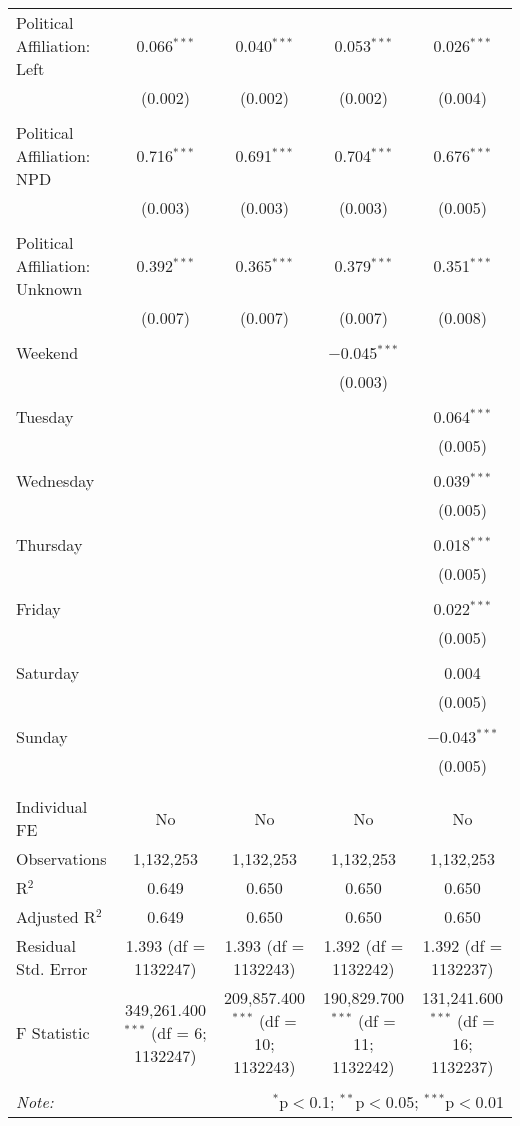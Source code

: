 \documentclass[
]{article}
\begin{document}
\begin{table}[!htbp]
{\begin{tabular}{@{\extracolsep{5pt}}lcccc}
 Political Affiliation: Left & 0.066$^{***}$ & 0.040$^{***}$ & 0.053$^{***}$ & 0.026$^{***}$ \\ 
  & (0.002) & (0.002) & (0.002) & (0.004) \\ 
  & & & & \\ 
 Political Affiliation: NPD & 0.716$^{***}$ & 0.691$^{***}$ & 0.704$^{***}$ & 0.676$^{***}$ \\ 
  & (0.003) & (0.003) & (0.003) & (0.005) \\ 
  & & & & \\ 
 Political Affiliation: Unknown & 0.392$^{***}$ & 0.365$^{***}$ & 0.379$^{***}$ & 0.351$^{***}$ \\ 
  & (0.007) & (0.007) & (0.007) & (0.008) \\ 
  & & & & \\ 
 Weekend &  &  & $-$0.045$^{***}$ &  \\ 
  &  &  & (0.003) &  \\ 
  & & & & \\ 
 Tuesday &  &  &  & 0.064$^{***}$ \\ 
  &  &  &  & (0.005) \\ 
  & & & & \\ 
 Wednesday &  &  &  & 0.039$^{***}$ \\ 
  &  &  &  & (0.005) \\ 
  & & & & \\ 
 Thursday &  &  &  & 0.018$^{***}$ \\ 
  &  &  &  & (0.005) \\ 
  & & & & \\ 
 Friday &  &  &  & 0.022$^{***}$ \\ 
  &  &  &  & (0.005) \\ 
  & & & & \\ 
 Saturday &  &  &  & 0.004 \\ 
  &  &  &  & (0.005) \\ 
  & & & & \\ 
 Sunday &  &  &  & $-$0.043$^{***}$ \\ 
  &  &  &  & (0.005) \\ 
  & & & & \\ 
\hline \\[-1.8ex] 
Individual FE & No & No & No & No \\ 
Observations & 1,132,253 & 1,132,253 & 1,132,253 & 1,132,253 \\ 
R$^{2}$ & 0.649 & 0.650 & 0.650 & 0.650 \\ 
Adjusted R$^{2}$ & 0.649 & 0.650 & 0.650 & 0.650 \\ 
Residual Std. Error & 1.393 (df = 1132247) & 1.393 (df = 1132243) & 1.392 (df = 1132242) & 1.392 (df = 1132237) \\ 
F Statistic & 349,261.400$^{***}$ (df = 6; 1132247) & 209,857.400$^{***}$ (df = 10; 1132243) & 190,829.700$^{***}$ (df = 11; 1132242) & 131,241.600$^{***}$ (df = 16; 1132237) \\ 
\hline 
\hline \\[-1.8ex] 
\textit{Note:}  & \multicolumn{4}{r}{$^{*}$p$<$0.1; $^{**}$p$<$0.05; $^{***}$p$<$0.01} \\ 
\end{tabular}
} 
\end{table} 
\newpage
\end{document}

